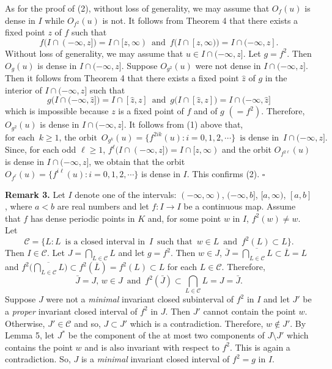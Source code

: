 \documentclass[12pt]{article}
\newcommand{\sq}{$\square$}
\begin{document}
As for the proof of (2), without loss of generality, we may assume that $O_f(u)$ is dense in $I$ while $O_{f^2}(u)$ is not.  It follows from Theorem 4 that there exists a fixed point $z$ of $f$ such that 
$$
f\big(I \cap (-\infty, z]\big) = I \cap [z, \infty) \,\,\, \text{and} \,\,\, f\big(I \cap [z, \infty)\big) = I \cap (-\infty, z].
$$
Without loss of generality, we may assume that $u \in I \cap (-\infty, z]$.  Let $g = f^2$.  Then $O_g(u)$ is dense in $I \cap (-\infty, z]$.  Suppose $O_{g^2}(u)$ were not dense in $I \cap (-\infty, z]$.  Then it follows from Theorem 4 that there exists a fixed point $\hat z$ of $g$ in the interior of $I \cap (-\infty, z]$ such that 
$$
g\big(I \cap (-\infty, \hat z]\big) = I \cap [\hat z, z] \,\,\, \text{and} \,\,\, g\big(I \cap [\hat z, z]\big) = I \cap (-\infty, \hat z]
$$
which is impossible because $z$ is a fixed point of $f$ and of $g$ $(= f^2)$.  Therefore, $O_{g^2}(u)$ is dense in $I \cap (-\infty, z]$.  It follows from (1) above that, 
$$
\text{for each} \,\,\, k \ge 1, \, \text{the orbit} \,\,\, O_{g^k}(u) = \{ f^{2ik}(u): i = 0, 1, 2, \cdots \} \,\,\, \text{is dense in} \,\,\, I \cap (-\infty, z].
$$
Since, for each odd $\ell \ge 1$, $f^\ell\big(I \cap (-\infty, z]\big) = I \cap [z, \infty)$ and the orbit $O_{f^{2\ell}}(u)$ is dense in $I \cap (-\infty, z]$, we obtain that the orbit $O_{f^\ell}(u) = \{ f^{i\ell}(u): i = 0, 1, 2, \cdots \}$ is dense in $I$.  This confirms (2).
\hfill{\sq}

\noindent
{\bf Remark 3.}
Let $I$ denote one of the intervals: $(-\infty, \infty)$, $(-\infty, b]$, $[a, \infty)$, $[a, b]$, where $a < b$ are real numbers and let $f : I \rightarrow I$ be a continuous map.  Assume that $f$ has dense periodic points in $K$ and, for some point $w$ in $I$, $f^2(w) \ne w$.  Let 
$$
\mathcal C = \big\{ L : L \,\,\, \text{is a closed interval in} \,\,\, I \,\,\, \text{such that} \,\,\, w \in L \,\,\, \text{and} \,\,\, f^2(L) \subset L \big\}.
$$ 
Then $I \in \mathcal C$.  Let $J = \bigcap_{L \in \mathcal C} L$ and let $g = f^2$.  Then $w \in J$, $\bar J = \overline {\bigcap_{L \in \mathcal C} L} \subset \overline L = L$ and $f^2\bigl(\overline {\bigcap_{L \in \mathcal C} L}\bigr) \subset f^2(\overline L) = f^2(L) \subset L$ for each $L \in \mathcal C$.  Therefore, 
$$
\bar J = J, \, w \in J \,\,\, \text{and} \,\,\, f^2(\bar J) \subset \bigcap_{L \in \mathcal C} L = J = \bar J.
$$
Suppose $J$ were not a {\it minimal} invariant closed subinterval of $f^2$ in $I$ and let $J'$ be a {\it proper} invariant closed interval of $f^2$ in $J$.  Then $J'$ cannot contain the point $w$.  Otherwise, $J' \in \mathcal C$ and so, $J \subset J'$ which is a contradiction.  Therefore, $w \notin J'$.  By Lemma 5, let $J^*$ be the component of the at most two components of $J \setminus J'$ which contains the point $w$ and is also invariant with respect to $f^2$.  This is again a contradiction.  So, $J$ is a {\it minimal} invariant closed interval of $f^2 = g$ in $I$.  
\end{document}
